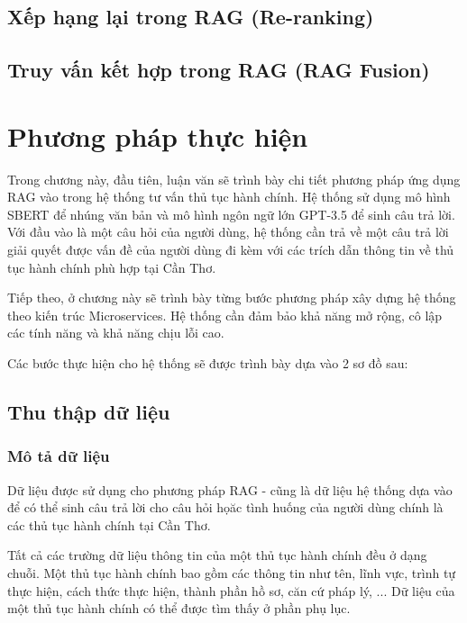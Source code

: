 \documentclass[a4paper, 12pt, openany]{book}
\begin{document}
\vspace{0.2cm}

\subsection{Xếp hạng lại trong RAG (Re-ranking)}

\subsection{Truy vấn kết hợp trong RAG (RAG Fusion)}

\section{Phương pháp thực hiện}
Trong chương này, đầu tiên, luận văn sẽ trình bày chi tiết phương pháp ứng dụng RAG vào trong hệ thống tư vấn thủ tục hành chính. Hệ thống sử dụng
mô hình SBERT để nhúng văn bản và mô hình ngôn ngữ lớn GPT-3.5 để sinh câu trả lời. Với đầu vào là một câu hỏi của người dùng, 
hệ thống cần trả về một câu trả lời giải quyết được vấn đề của người dùng đi kèm với các trích dẫn thông tin về thủ tục hành chính phù hợp tại Cần Thơ.

Tiếp theo, ở chương này sẽ trình bày từng bước phương pháp xây dựng hệ thống theo kiến trúc Microservices.
Hệ thống cần đảm bảo khả năng mở rộng, cô lập các tính năng và khả năng chịu lỗi cao.

Các bước thực hiện cho hệ thống sẽ được trình bày dựa vào 2 sơ đồ sau:
\subsection{Thu thập dữ liệu}
\subsubsection{Mô tả dữ liệu}
Dữ liệu được sử dụng cho phương pháp RAG - cũng là dữ liệu hệ thống dựa vào để có thể sinh câu trả lời cho câu hỏi họăc tình huống
của người dùng chính là các thủ tục hành chính tại Cần Thơ.

Tất cả các trường dữ liệu thông tin của một thủ tục hành chính đều ở dạng chuỗi. Một thủ tục hành chính bao gồm các thông tin như tên, lĩnh vực, trình tự thực hiện,
cách thức thực hiện, thành phần hồ sơ, căn cứ pháp lý, ... Dữ liệu của một thủ tục hành chính có thể được tìm thấy ở phần phụ lục.
\end{document}
